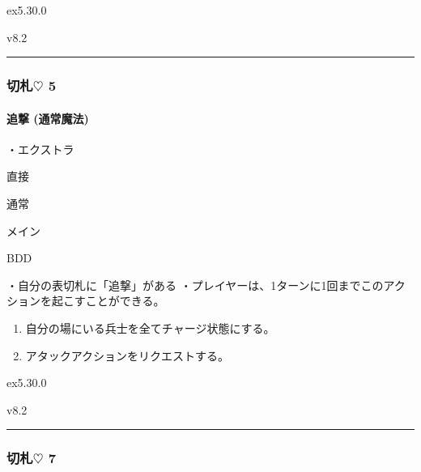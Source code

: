 \documentclass[letterpaper,10pt,dvipdfmx]{sphinxmanual}
\begin{document}
\sphinxAtStartPar
{}  ex5.30.0

\sphinxAtStartPar
{}  v8.2


\bigskip\hrule\bigskip



\subsubsection{切札{\normalsize $\heartsuit$} 5}
\label{\detokenize{auto/frameActionlist:id37}}

\paragraph{追撃 (通常魔法)}
\label{\detokenize{auto/frameActionlist:act-pursuit}}\label{\detokenize{auto/frameActionlist:id38}}
\sphinxAtStartPar
{}

\sphinxAtStartPar
・エクストラ

\sphinxAtStartPar
{} 直接

\sphinxAtStartPar
{} 通常

\sphinxAtStartPar
{} メイン

\sphinxAtStartPar
{} BDD

\sphinxAtStartPar
{}

\sphinxAtStartPar
・自分の表切札に「追撃」がある
・プレイヤーは、1ターンに1回までこのアクションを起こすことができる。

\sphinxAtStartPar
{}
\begin{enumerate}
%
\item {} 
\sphinxAtStartPar
自分の場にいる兵士を全てチャージ状態にする。

\item {} 
\sphinxAtStartPar
アタックアクションをリクエストする。

\end{enumerate}

\sphinxAtStartPar
{}  ex5.30.0

\sphinxAtStartPar
{}  v8.2


\bigskip\hrule\bigskip



\subsubsection{切札{\normalsize $\heartsuit$} 7}
\label{\detokenize{auto/frameActionlist:id39}}
\end{document}
